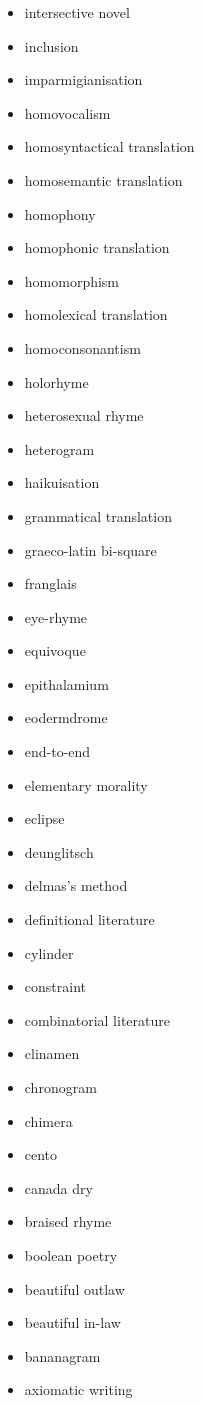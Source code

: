 \begin{multicols}{3}
\begin{itemize}
  \item intersective novel
  \item inclusion
  \item imparmigianisation
  \item homovocalism
  \item homosyntactical translation
  \item homosemantic translation
  \item homophony
  \item homophonic translation
  \item homomorphism
  \item homolexical translation
  \item homoconsonantism
  \item holorhyme
  \item heterosexual rhyme
  \item heterogram
  \item haikuisation
  \item grammatical translation
  \item graeco-latin bi-square
  \item franglais
  \item eye-rhyme
  \item equivoque
  \item epithalamium
  \item eodermdrome
  \item end-to-end
  \item elementary morality
  \item eclipse
  \item deunglitsch
  \item delmas's method
  \item definitional literature
  \item cylinder
  \item constraint
  \item combinatorial literature
  \item clinamen
  \item chronogram
  \item chimera
  \item cento
  \item canada dry
  \item braised rhyme
  \item boolean poetry
  \item beautiful outlaw
  \item beautiful in-law
  \item bananagram
  \item axiomatic writing

\end{itemize}
\end{multicols}
